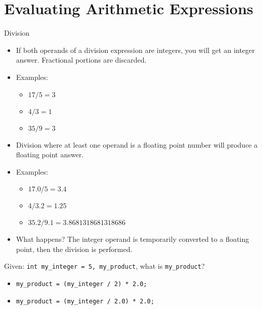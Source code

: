 \documentclass[graphics]{beamer}
\begin{document}
\section{Evaluating Arithmetic Expressions}\label{sec:evalarithexp}
\begin{frame}{Division}
     {
        \begin{itemize}
            \item If both operands of a division expression are integers, you will get an integer answer. Fractional portions are discarded.
            \item Examples:
            \begin{itemize}
                \item $17/5 = 3$
                \item $4/3 = 1$
                \item $35/9 = 3$
            \end{itemize}
        \end{itemize}
    }
     {
        \begin{itemize}
            \item Division where at least one operand is a floating point number will produce a floating point answer.
            \item Examples:
            \begin{itemize}
                \item $17.0 / 5 = 3.4$
                \item $4/3.2 = 1.25$
                \item $35.2/9.1 = 3.8681318681318686$
            \end{itemize}
            \item What happens? The integer operand is temporarily converted to a floating point, then the division is performed.
        \end{itemize}
    }
     {
        Given: \texttt{int my\_integer = 5, my\_product}, what is \texttt{my\_product}?
        \begin{itemize}
            \item \texttt{my\_product = (my\_integer / 2) * 2.0;} 
            \item \texttt{my\_product = (my\_integer / 2.0) * 2.0;} 
        \end{itemize}
    }
\end{frame}
\end{document}
